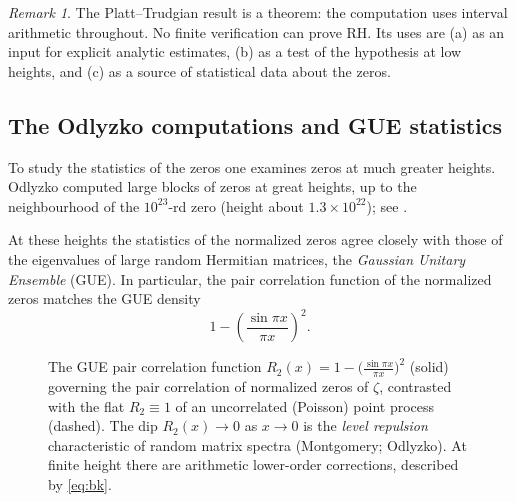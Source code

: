 \documentclass[11pt]{amsart}
\theoremstyle{definition}
\theoremstyle{remark}
\newtheorem{remark}[theorem]{Remark}
\begin{document}
\begin{remark}
The Platt--Trudgian result is a theorem: the computation uses interval arithmetic throughout. No finite verification can prove RH. Its uses are (a) as an input for explicit analytic estimates, (b) as a test of the hypothesis at low heights, and (c) as a source of statistical data about the zeros.
\end{remark}

\subsection{The Odlyzko computations and GUE statistics}\label{sec:odlyzko}

To study the statistics of the zeros one examines zeros at much greater heights. Odlyzko computed large blocks of zeros at great heights, up to the neighbourhood of the $10^{23}$-rd zero (height about $1.3\times10^{22}$); see \cite{odlyzko1987,hiary2012}.

At these heights the statistics of the normalized zeros agree closely with those of the eigenvalues of large random Hermitian matrices, the \emph{Gaussian Unitary Ensemble} (GUE). In particular, the pair correlation function of the normalized zeros matches the GUE density
\[
1 - \left(\frac{\sin \pi x}{\pi x}\right)^2.
\]

\begin{figure}[ht]
\centering
{}
\caption{The GUE pair correlation function $R_2(x)=1-\big(\tfrac{\sin\pi x}{\pi x}\big)^2$ (solid) governing the pair correlation of normalized zeros of $\zeta$, contrasted with the flat $R_2\equiv 1$ of an uncorrelated (Poisson) point process (dashed). The dip $R_2(x)\to 0$ as $x\to 0$ is the \emph{level repulsion} characteristic of random matrix spectra (Montgomery; Odlyzko). At finite height there are arithmetic lower-order corrections, described by \eqref{eq:bk}.}
\label{fig:gue}
\end{figure}
\end{document}
